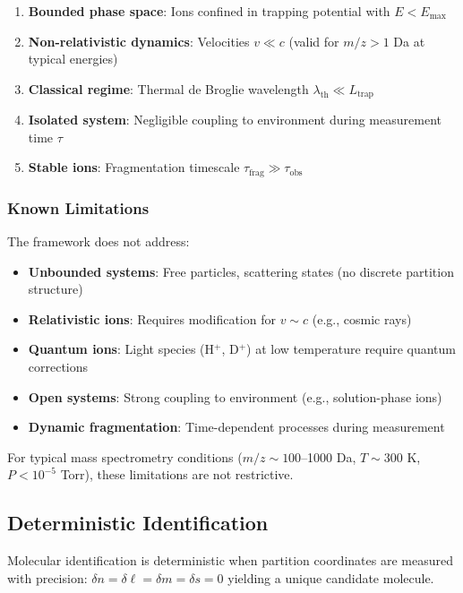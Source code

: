 \begin{enumerate}
    \item \textbf{Bounded phase space}: Ions confined in trapping potential with $E < E_{\max}$
    \item \textbf{Non-relativistic dynamics}: Velocities $v \ll c$ (valid for $m/z > 1$ Da at typical energies)
    \item \textbf{Classical regime}: Thermal de Broglie wavelength $\lambda_{\mathrm{th}} \ll L_{\mathrm{trap}}$
    \item \textbf{Isolated system}: Negligible coupling to environment during measurement time $\tau$
    \item \textbf{Stable ions}: Fragmentation timescale $\tau_{\mathrm{frag}} \gg \tau_{\mathrm{obs}}$
\end{enumerate}

\subsubsection{Known Limitations}

The framework does not address:

\begin{itemize}
    \item \textbf{Unbounded systems}: Free particles, scattering states (no discrete partition structure)
    \item \textbf{Relativistic ions}: Requires modification for $v \sim c$ (e.g., cosmic rays)
    \item \textbf{Quantum ions}: Light species (H$^+$, D$^+$) at low temperature require quantum corrections
    \item \textbf{Open systems}: Strong coupling to environment (e.g., solution-phase ions)
    \item \textbf{Dynamic fragmentation}: Time-dependent processes during measurement
\end{itemize}

For typical mass spectrometry conditions ($m/z \sim 100$–1000 Da, $T \sim 300$ K, $P < 10^{-5}$ Torr), these limitations are not restrictive.

\subsection{Deterministic Identification}

\begin{proposition}
\label{prop:identification}
Molecular identification is deterministic when partition coordinates are measured with precision:
$
\delta n = \delta \ell = \delta m = \delta s = 0
$
yielding a unique candidate molecule.
\end{proposition}

